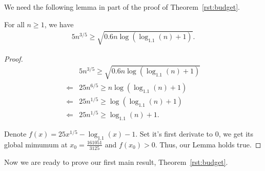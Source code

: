 We need the following lemma in part of the proof of Theorem~\ref{rst:budget}.
\begin{lemma}
For all $n\geq 1$, we have
\begin{align}
5n^{3/5} \geq \sqrt{0.6n \log(\log_{1.1}(n)+1)}. \nonumber
\end{align}
\label{lemma:cal2}
\end{lemma}
\begin{proof}
\begin{align}
&5 n^{3/5} \geq \sqrt{0.6n \log(\log_{1.1}(n)+1)} \nonumber \\
\Longleftarrow &  25 n^{6/5} \geq n \log(\log_{1.1}(n)+1) \nonumber  \\
\Longleftarrow &  25 n^{1/5} \geq \log(\log_{1.1}(n)+1) \nonumber \\
\Longleftarrow &  25 n^{1/5} \geq \log_{1.1}(n)+1. \nonumber 
\end{align}

Denote $f(x) = 25x^{1/5} - \log_{1.1}(x)-1$. Set it's first derivate to $0$, we get its global mimumum at $x_0=\frac{161051}{3125}$ and $f(x_0)> 0$. Thus, our Lemma holds true.

\end{proof}


Now we are ready to prove our first main result, Theorem~\ref{rst:budget}.

